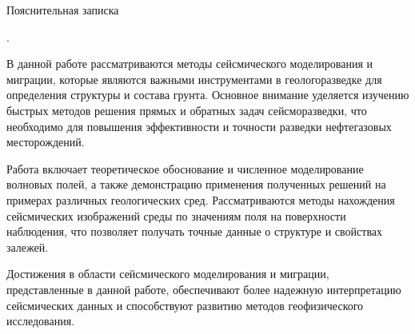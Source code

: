 Пояснительная записка \printtotal

.


В данной работе рассматриваются методы сейсмического моделирования и миграции, которые являются важными инструментами в геологоразведке для определения структуры и состава грунта. Основное внимание уделяется изучению быстрых методов решения прямых и обратных задач сейсморазведки, что необходимо для повышения эффективности и точности разведки нефтегазовых месторождений.

Работа включает теоретическое обоснование и численное моделирование волновых полей, а также демонстрацию применения полученных решений на примерах различных геологических сред. Рассматриваются методы нахождения сейсмических изображений среды по значениям поля на поверхности наблюдения, что позволяет получать точные данные о структуре и свойствах залежей.

Достижения в области сейсмического моделирования и миграции, представленные в данной работе, обеспечивают более надежную интерпретацию сейсмических данных и способствуют развитию методов геофизического исследования.
 
